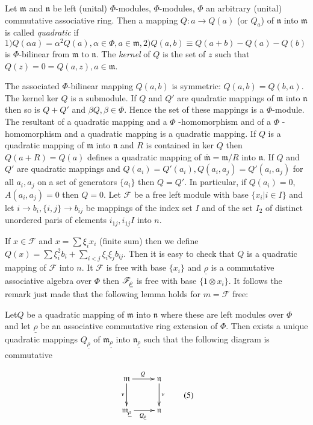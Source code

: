 \begin{defn}\label{c1:defn2}
Let $\mathfrak{m}$  and $\mathfrak{n}$ be left (unital)
$\Phi$-modules, $\Phi$-modules, $\Phi$ an arbitrary (unital)
commutative associative ring. Then a mapping $Q:a\to Q(a)$ (or $Q_a$)
of $\mathfrak{n}$ into $\mathfrak{m}$ is called {\em quadratic} if $1)
Q(\alpha a)=\alpha^{2}Q(a), \alpha \in \Phi, a\in \mathfrak{m}, 2)
Q(a,b)\equiv Q(a+b)-Q(a)-Q(b)$ is $\Phi$\pageoriginale-bilinear from
$\mathfrak{m}$ to $\mathfrak{n}$. The {\em kernel} of $Q$ is the set
of $z$ such that $Q(z)=0=Q(a,z),a\in \mathfrak{m}$. 

The associated $\Phi$-bilinear mapping $Q(a,b)$ is symmetric:
$Q(a,b)=Q(b,a)$. The kernel ker $Q$ is a submodule. If $Q$ and $Q'$
are quadratic mappings of $\mathfrak{m}$ into $\mathfrak{n}$ then so
is $Q+Q'$ and $\beta Q, \beta \in \Phi$. Hence the set of these
mappings is a $\Phi$-module. The resultant of a quadratic mapping and
a $\Phi$ -homomorphism and of a $\Phi$ -homomorphism and a quadratic
mapping is a quadratic mapping. If $Q$ is a quadratic mapping of
$\mathfrak{m}$ into $\mathfrak{n}$ and $R$ is contained in ker $Q$
then $Q(a+R)=Q(a)$ defines a quadratic mapping of
$\overline{\mathfrak{m}}=\mathfrak{m}/R$ into $\mathfrak{n}$. If $Q$
and $Q'$ are quadratic mappings and
$Q(a_i)=Q'(a_i),Q(a_i,a_j)=Q'(a_i,a_j)$ for all $a_i,a_j$ on a set of
generators $\{a_i\}$ then $Q=Q'$. In particular, if $Q(a_i)=0$, $A(a_i
, a_j)=0$ then
$Q=0$. Let $\mathscr{F}$ be a free left module with base $\{x_i | i\in
I\}$ and let $i\to b_i,\{i,j\}\to b_{ij}$ be mappings of the index set
$I$ and of the set $I_2$ of distinct unordered paris of elements
$i_{1j}, i_{1j} I$ into $n$. 

If $x\in\mathscr{F}$ and $x=\sum\xi_{i} x_i$ (finite sum) then we
define $Q(x)=\sum \xi_i^{2} b_i+\displaystyle{\sum_{i<j}}\xi_i\xi_jb_{ij}$. Then it
is easy to check that $Q$ is a quadratic mapping of $\mathscr{F}$ into
$n$. It $\mathscr{F}$ is free with base $\{x_i\}$ and
$\underline{\rho}$ is a commutative associative algebra over $\Phi$
then $\mathscr{F}_{\underline{\rho}}$ is free with base $\{1\otimes x_i\}$. It follows the remark
just made that the following lemma holds for $m=\mathscr{F}$ free: 
\end{defn}

\begin{lemma*}
Let\pageoriginale $Q$ be a quadratic mapping of $\mathfrak{m}$ into $\mathfrak{n}$ where these are left modules over $\Phi$ and let $\underline{\rho}$ be an associative commutative ring extension of $\Phi$. Then exists a unique quadratic mappings $Q_{\underline{\rho}}$ of $\mathfrak{m}_{\underline{\rho}}$ into $\mathfrak{n}_{\underline{\rho}}$ such that the following diagram is commutative
\end{lemma*}
\[
\vcenter{
\xymatrix{
\mathfrak{m}\ar[d]_{\nu}\ar[r]^{Q}& \mathfrak{n}\ar[d]^{\nu}\\
\mathfrak{m}_{\underline{\rho}}\ar[r]_{Q_{\underline{\rho}}}& \mathfrak{n}
}}\tag{5}\label{c1:eq5}
\]

